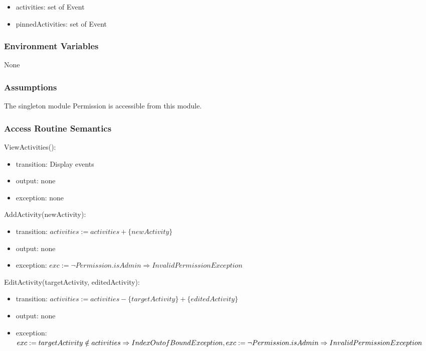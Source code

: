 \documentclass[12pt, titlepage]{article}
\begin{document}
\begin{itemize}
  \item activities: set of Event
  \item pinnedActivities: set of Event
\end{itemize}

\subsubsection{Environment Variables}

None

\subsubsection{Assumptions}

The singleton module Permission is accessible from this module.

\subsubsection{Access Routine Semantics}

\noindent ViewActivities():
\begin{itemize}
\item transition: Display events
\item output: none
\item exception: none
\end{itemize}

\noindent AddActivity(newActivity):
\begin{itemize}
\item transition: $activities := activities + \{newActivity\}$
\item output: none
\item exception: $exc := \neg Permission.isAdmin \Rightarrow InvalidPermission Exception$
\end{itemize}

\noindent EditActivity(targetActivity, editedActivity):
\begin{itemize}
\item transition: $activities := activities - \{targetActivity\} + \{editedActivity\}$
\item output: none
\item exception: $exc := targetActivity \notin activities \Rightarrow IndexOutofBound Exception,\\ 
                  exc := \neg Permission.isAdmin \Rightarrow InvalidPermission Exception$
\end{itemize}
\end{document}
